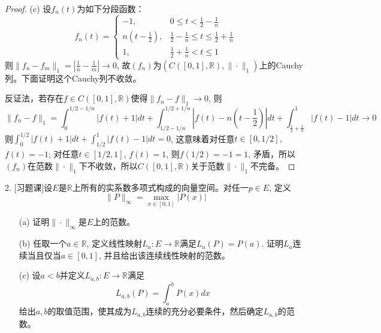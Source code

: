 \documentclass[a4paper,8pt]{ctexart}\textwidth 140mm \textheight 216mm
\newcommand{\8}{\infty}
\begin{document}
\begin{proof}
    (c) 设$f_n(t)$为如下分段函数：
    \[f_n(t)=\begin{cases}
    -1, & 0\leq t<\frac{1}{2}-\frac{1}{n}\\
    n(t-\frac{1}{2}), & \frac{1}{2}-\frac{1}{n}\leq t\leq \frac{1}{2}+\frac{1}{n}\\
    1, & \frac{1}{2}+\frac{1}{n}<t\leq 1
    \end{cases}\]
    则$\|f_n-f_m\|_1=|\frac{1}{n}-\frac{1}{m}|\to0$, 故$(f_n)$为$(C([0,1],\mathbb{R}),\|\cdot\|_1)$上的Cauchy列。下面证明这个Cauchy列不收敛。
    
    反证法，若存在$f\in C([0,1],\mathbb{R})$使得$\|f_n-f\|_1\to0$, 则
    \[\|f_n-f\|_1=\int_0^{1/2-1/n}|f(t)+1|dt+\int_{1/2-1/n}^{1/2+1/n}|f(t)-n(t-\frac{1}{2})|dt+\int_{\frac{1}{2}+\frac{1}{n}}^1|f(t)-1|dt\to 0\]
    则$\int_0^{1/2}|f(t)+1|dt+\int_{1/2}^1 |f(t)-1|dt=0$, 这意味着对任意$t\in[0,1/2], $$f(t)=-1$; 对任意$t\in[1/2,1]$, $f(t)=1$, 则$f(1/2)=-1=1$, 矛盾，所以$(f_n)$在范数$\|\cdot\|_1$下不收敛，所以$C([0,1],\mathbb{R})$关于范数$\|\cdot\|_1$不完备。
\end{proof}

2. [习题课]设$E$是$\mathbb{R}$上所有的实系数多项式构成的向量空间。对任一$p\in E$, 定义
$$\|P\|_\infty=\max_{x\in[0,1]}|P(x)|$$
\begin{enumerate}
	\item[(a)] 证明$\|\cdot\|_\infty$是$E$上的范数。
	\item[(b)] 任取一个$a\in\mathbb{R}$, 定义线性映射$L_a:E\to\mathbb{R}$满足$L_a(P)=P(a)$. 证明$L_a$连续当且仅当$a\in[0,1]$, 并且给出该连续线性映射的范数。
	\item[(c)] 设$a<b$并定义$L_{a,b}:E\to\mathbb{R}$满足
	$$L_{a,b}(P)=\int_a^b P(x)dx$$
	给出$a,b$的取值范围，使其成为$L_{a,b}$连续的充分必要条件，然后确定$L_{a,b}$的范数。
\end{enumerate}
\end{document}
